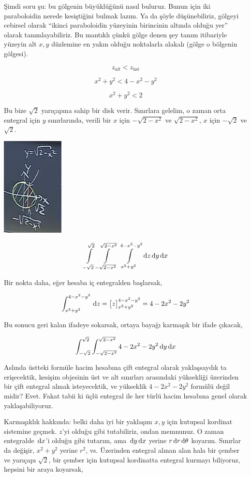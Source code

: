 \documentclass[12pt,fleqn]{article}\usepackage{../../common}
\begin{document}
Şimdi soru şu: bu gölgenin büyüklüğünü nasıl buluruz. Bunun için iki
paraboloidin nerede kesiştiğini bulmak lazım. Ya da şöyle düşünebiliriz,
gölgeyi cebirsel olarak ``ikinci paraboloidin yüzeyinin birincinin altında
olduğu yer'' olarak tanımlayabiliriz. Bu mantıklı çünkü gölge denen şey
tanım itibariyle yüzeyin alt $x,y$ düzlemine en yakın olduğu noktalarla
alakalı (gölge o bölgenin gölgesi).

$$ z_{alt} < z_{\textrm{üst}} $$

$$ x^2 + y^2 < 4 - x^2 -y^2 $$

$$ x^2 + y^2 < 2 $$

Bu bize $\sqrt{2}$ yarıçapına sahip bir disk verir. Sınırlara gelelim, o
zaman orta entegral için $y$ sınırlarında, verili bir $x$ için
$-\sqrt{2-x^2}$ ve $\sqrt{2-x^2}$, $x$ için $-\sqrt{2}$ ve $\sqrt{2}$.

\includegraphics[height=5cm]{25_7.png}

$$ 
\int\limits_{-\sqrt{2}}^{\sqrt{2}}
\int\limits_{-\sqrt{2-x^2}}^{\sqrt{2-x^2}} 
\int\limits_{x^2+y^2}^{4-x^2-y^2} 
\,\mathrm{d} z \,\mathrm{d} y \,\mathrm{d} x
$$

Bir nokta daha, eğer hesaba iç entegralden başlarsak, 

$$ 
\int_{x^2+y^2}^{4-x^2-y^2} \,\mathrm{d} z = 
\big[ z \big]_{x^2+y^2}^{4-x^2-y^2} = 
4-2x^2-2y^2
$$

Bu sonucu geri kalan ifadeye sokarsak, ortaya bayağı karmaşık bir ifade
çıkacak, 

$$ 
\int _{-\sqrt{2}}^{\sqrt{2}} \int _{-\sqrt{2-x^2}}^{\sqrt{2-x^2}} 
4-2x^2-2y^2 \,\mathrm{d} y \,\mathrm{d} x
$$

Aslında üstteki formüle hacim hesabına çift entegral olarak yaklaşsaydık ta
erişecektik, kesişim objesinin üst ve alt sınırları arasındaki yüksekliği
üzerinden bir çift entegral almak isteyecektik, ve yükseklik $4-2x^2-2y^2$
formülü değil midir? Evet. Fakat tabii ki üçlü entegral ile her türlü hacim
hesabına genel olarak yaklaşabiliyoruz.

Karmaşıklık hakkında: belki daha iyi bir yaklaşım $x,y$ için kutupsal
kordinat sistemine geçmek. $z$'yi olduğu gibi tutabiliriz, ondan
memnunuz. O zaman entegralde $\,\mathrm{d} x$'i olduğu gibi tutarım, ama
$\,\mathrm{d} y \,\mathrm{d} x$ yerine $r \,\mathrm{d} r \,\mathrm{d}\theta$ koyarım. Sınırlar da değişir,
$x^2+y^2$ yerine $r^2$, vs. Üzerinden entegral alınan alan hala bir çember
ve yarıçapı $\sqrt{2}$, bir çember için kutupsal kordinatta entegral
kurmayı biliyoruz, hepsini bir araya koyarsak,
\end{document}
